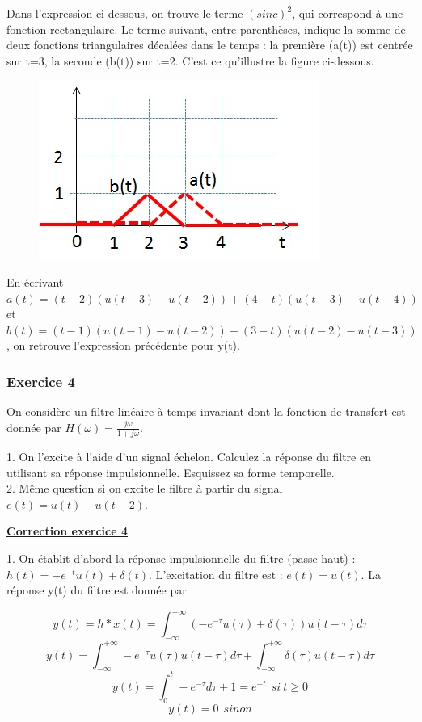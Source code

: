 \documentclass[11pt]{report}
\begin{document}
	Dans l'expression ci-dessous, on trouve le terme $(sinc)^{2}$, qui correspond à une fonction rectangulaire. Le terme suivant, entre parenthèses, indique la somme de deux fonctions triangulaires décalées dans le temps : la première (a(t)) est centrée sur t=3, la seconde (b(t)) sur t=2. C'est ce qu'illustre la figure ci-dessous.
	\begin{figure}[h!]
		\centering
		\includegraphics[scale=0.6]{images/Courbes_TD_Convolution_2_Solution_2.jpg} 
	\end{figure}
	En écrivant $a(t)=(t-2)(u(t-3)-u(t-2))+(4-t)(u(t-3)-u(t-4))$ et $b(t)=(t-1)(u(t-1)-u(t-2))+(3-t)(u(t-2)-u(t-3))$, on retrouve l'expression précédente pour y(t).
	
	\vspace{1\baselineskip}
	
	\subsubsection{Exercice 4}
	On considère un filtre linéaire à temps invariant dont la fonction de transfert est donnée par $H(\omega)=\frac{j\omega}{1+j\omega}$. 
	
	1. On l'excite à l'aide d'un signal échelon. Calculez la réponse du filtre en utilisant sa réponse impulsionnelle. Esquissez sa forme temporelle.\\
	
	2. Même question si on excite le filtre à partir du signal $e(t)=u(t)-u(t-2)$. 
	
	\vspace{1\baselineskip}
	
	\textbf{\underline{Correction exercice 4}}\
	
	1. On établit d'abord la réponse impulsionnelle du filtre (passe-haut) : $h(t)=-e^{-t}u(t)+\delta(t)$. L'excitation du filtre est : $e(t)=u(t)$.
	La réponse y(t) du filtre est donnée par :
	
	\begin{equation*}
	y(t)=h*x(t)=\int_{-\infty}^{+\infty}(-e^{-\tau}u(\tau)+\delta(\tau))u(t-\tau)d\tau
	\end{equation*}
	\begin{equation*}
	y(t)=\int_{-\infty}^{+\infty}-e^{-\tau}u(\tau)u(t-\tau)d\tau+\int_{-\infty}^{+\infty}\delta(\tau)u(t-\tau)d\tau
	\end{equation*}
	\begin{equation*}
	y(t)=\int_{0}^{t}-e^{-\tau}d\tau+1=e^{-t}~~si~t\geq 0
	\end{equation*}
	\begin{equation*}
	y(t)=0~~sinon
	\end{equation*}
	
\end{document}
